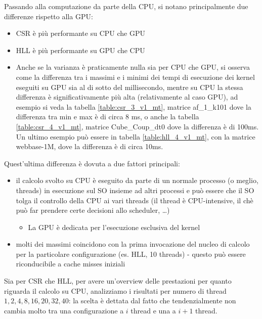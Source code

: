 \documentclass[a4paper,9pt]{extarticle}
\begin{document}
Passando alla computazione da parte della CPU, si notano principalmente due differenze rispetto
alla GPU:
\begin{itemize}
	\item CSR è più performante su CPU che GPU
	\item HLL è più performante su GPU che CPU
	\item Anche se la varianza è praticamente nulla sia per CPU che GPU, si osserva
	come la differenza tra i massimi e i minimi dei tempi di esecuzione
	dei kernel eseguiti su GPU sia al di sotto del millisecondo, mentre su CPU la stessa
	differenza è significativamente più alta (relativamente al caso GPU), ad esempio si veda
	la tabella \ref{table:csr_3_v1_mt}, matrice af\_1\_k101 dove la differenza tra min e max 
	è di circa 8 ms, o anche la tabella \ref{table:csr_4_v1_mt}, matrice Cube\_Coup\_dt0 dove
	la differenza è di 100ms. Un ultimo esempio può essere in tabella \ref{table:hll_4_v1_mt},
	con la matrice webbase-1M, dove la differenza è di circa 10ms.
\end{itemize}

Quest'ultima differenza è dovuta a due fattori principali: 

\begin{itemize}
	\item il calcolo svolto su CPU è eseguito da parte
		di un normale processo (o meglio, threads)
	in esecuzione sul SO insieme ad altri processi e può essere che il SO
	tolga il controllo della CPU ai vari threads (il thread è CPU-intensive, il chè può far 
	prendere certe decisioni allo scheduler, \dots)
	
	\begin{itemize}
		\item La GPU è dedicata per l'esecuzione esclusiva del kernel
	\end{itemize}
	
	\item molti dei massimi coincidono con la prima invocazione del nucleo di calcolo per la
	particolare configurazione (es. HLL, 10 threads) - 
	questo può essere riconducibile a cache misses iniziali
\end{itemize}

Sia per CSR che HLL, per avere un'overview delle prestazioni per quanto riguarda il calcolo
su CPU, analizziamo i risultati per numero di thread $1,2,4,8,16,20,32,40$: la scelta è dettata
dal fatto che tendenzialmente non cambia molto tra una configurazione a $i$ thread e una a $i+1$ 
thread.
\end{document}
